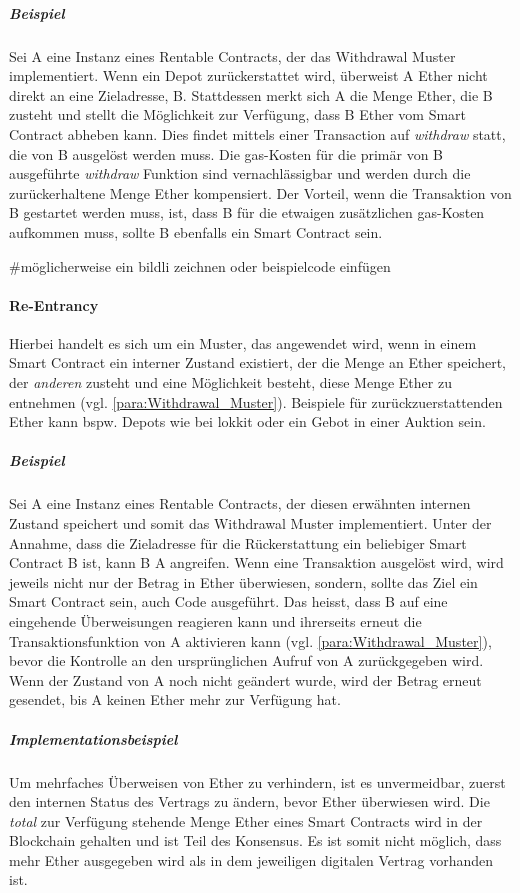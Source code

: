 \subparagraph{Beispiel}
Sei A eine Instanz eines Rentable Contracts, der das Withdrawal Muster implementiert. Wenn ein Depot zurückerstattet wird, überweist A Ether nicht direkt an eine Zieladresse, B. Stattdessen merkt sich A die Menge Ether, die B zusteht und stellt die Möglichkeit zur Verfügung, dass B Ether vom Smart Contract abheben kann. Dies findet mittels einer Transaction auf \emph{withdraw} statt, die von B ausgelöst werden muss. Die gas-Kosten für die primär von B ausgeführte \emph{withdraw} Funktion sind vernachlässigbar und werden durch die zurückerhaltene Menge Ether kompensiert. Der Vorteil, wenn die Transaktion von B gestartet werden muss, ist, dass B für die etwaigen zusätzlichen gas-Kosten aufkommen muss, sollte B ebenfalls ein Smart Contract sein.

\#möglicherweise ein bildli zeichnen oder beispielcode einfügen

\paragraph{Re-Entrancy}
Hierbei handelt es sich um ein Muster, das angewendet wird, wenn in einem Smart Contract ein interner Zustand existiert, der die Menge an Ether speichert, der \emph{anderen} zusteht und eine Möglichkeit besteht, diese Menge Ether zu entnehmen (vgl. \ref{para:Withdrawal_Muster}). Beispiele für zurückzuerstattenden Ether kann bspw. Depots wie bei lokkit oder ein Gebot in einer Auktion sein.\cite[Security Considerations/Re-Entrancy]{solidity.readthedocs.io}

\subparagraph{Beispiel}
Sei A eine Instanz eines Rentable Contracts, der diesen erwähnten internen Zustand speichert und somit das Withdrawal Muster implementiert. Unter der Annahme, dass die Zieladresse für die Rückerstattung ein beliebiger Smart Contract B ist, kann B A angreifen. Wenn eine Transaktion ausgelöst wird, wird jeweils nicht nur der Betrag in Ether überwiesen, sondern, sollte das Ziel ein Smart Contract sein, auch Code ausgeführt. Das heisst, dass B auf eine eingehende Überweisungen reagieren kann und ihrerseits erneut die Transaktionsfunktion von A aktivieren kann (vgl. \ref{para:Withdrawal_Muster}), bevor die Kontrolle an den ursprünglichen Aufruf von A zurückgegeben wird. Wenn der Zustand von A noch nicht geändert wurde, wird der Betrag erneut gesendet, bis A keinen Ether mehr zur Verfügung hat.

\subparagraph{Implementationsbeispiel}
Um mehrfaches Überweisen von Ether zu verhindern, ist es unvermeidbar, zuerst den internen Status des Vertrags zu ändern, bevor Ether überwiesen wird. Die \emph{total} zur Verfügung stehende Menge Ether eines Smart Contracts wird in der Blockchain gehalten und ist Teil des Konsensus. Es ist somit nicht möglich, dass mehr Ether ausgegeben wird als in dem jeweiligen digitalen Vertrag vorhanden ist. 

